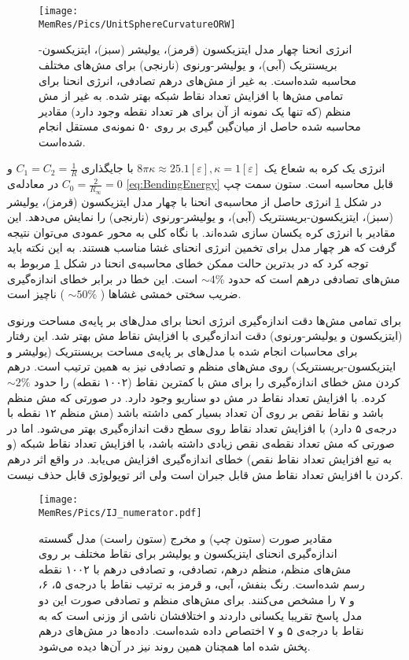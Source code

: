 \begin{figure}[htbp]
\begin{center}
\texttt{[image: \\MemRes/Pics/UnitSphereCurvatureORW]}
\caption{
انرژی انحنا چهار مدل ایتزیکسون (قرمز)، یولیشر (سبز)، ایتزیکسون-بریسنتریک (آبی)، و یولیشر-ورنوی (نارنجی) برای مش‌های مختلف محاسبه شده‌است. به غیر از مش‌های درهم تصادفی، انرژی انحنا برای تمامی مش‌ها با افزایش تعداد نقاط شبکه بهتر شده. به غیر از مش منظم (که تنها یک نمونه از آن برای هر تعداد نقطه وجود دارد) مقادیر محاسبه شده حاصل از میان‌گین گیری بر روی ۵۰ نمونه‌ی مستقل انجام شده‌است.
}
\label{fig:unitsphereBending}
\end{center}
\end{figure}

انرژی یک کره‌ به شعاع یک 
$8\pi\kappa\approx 25.1[\varepsilon],\kappa=1[\varepsilon]$
با جایگذاری 
$C_1=C_2=\frac{1}{R}$
و
$C_0=\frac{2}{R_\infty}=0$
در معادله‌ی 
\ref{eq:BendingEnergy}
قابل محاسبه‌ است. ستون سمت چپ در شکل 
\ref{fig:unitsphereBending}
انرژی حاصل از محاسبه‌ی انحنا با چهار مدل ایتزیکسون (قرمز)، یولیشر (سبز)، ایتزیکسون-بریسنتریک (آبی)، و یولیشر-ورنوی (نارنجی) را نمایش می‌دهد. این مقادیر با انرژی کره یکسان سازی شده‌اند. با نگاه کلی به محور عمودی می‌توان نتیجه گرفت که هر چهار مدل برای تخمین انرژی انحنای غشا مناسب هستند. به این نکته باید توجه کرد که در بدترین حالت ممکن خطای محاسبه‌ی انحنا در شکل 
\ref{fig:unitsphereBending}
مربوط به مش‌های تصادفی درهم است که حدود
$\sim4\%$
است. این خطا در برابر خطای اندازه‌گیری ضریب سختی خمشی غشا‌ها (
$\sim50\%$
) ناچیز است.

برای تمامی مش‌ها دقت اندازه‌گیری انرژی انحنا برای مدل‌های بر پایه‌ی مساحت ورنوی (ایتزیکسون و یولیشر-ورنوی) دقت اندازه‌گیری با افزایش نقاط مش بهتر شد. این رفتار برای محاسبات انجام شده با مدل‌های بر پایه‌ی مساحت بریسنتریک (یولیشر و ایتزیکسون-بریسنتریک) روی مش‌های منظم و تصادفی نیز به همین ترتیب است. درهم کردن مش خطای اندازه‌‌گیری را برای مش با کمترین نقاط (۱۰۰۲ نقطه) را حدود 
$\sim2\%$
کرده. با افزایش تعداد نقاط در مش دو سناریو وجود دارد. در صورتی که مش‌ منظم باشد و نقاط نقص بر روی آن تعداد بسیار کمی داشته باشد (مش منظم ۱۲ نقطه با درجه‌ی ۵ دارد) با افزایش تعداد نقاط روی سطح دقت اندازه‌گیری بهتر می‌شود. اما در صورتی که مش تعداد نقطه‌ی نقص زیادی داشته باشد، با افزایش تعداد نقاط شبکه (و به تبع افزایش تعداد نقاط نقص) خطای اندازه‌گیری افزایش می‌یابد. در واقع اثر درهم کردن با افزایش تعداد نقاط مش قابل جبران است ولی اثر توپولوژی قابل حذف نیست.



\begin{figure}[htbp]
\begin{center}
\texttt{[image: \\MemRes/Pics/IJ\_numerator.pdf]}
\caption{
مقادیر صورت (ستون چپ) و مخرج (ستون راست) مدل گسسته اندازه‌گیری انحنای ایتزیکسون و یولیشر برای نقاط مختلف بر روی مش‌های منظم، منظم درهم، تصادفی، و تصادفی درهم با ۱۰۰۲ نقطه رسم شده‌است. رنگ بنفش، آبی، و قرمز به ترتیب  نقاط با درجه‌ی ۵، ۶، و ۷ را مشخص می‌کنند. برای مش‌های منظم و تصادفی صورت این دو مدل پاسخ تقریبا یکسانی داردند و اختلافشان ناشی از وزنی است که به نقاط با درجه‌ی ۵ و ۷ اختصاص داده شده‌است. داده‌ها در مش‌های درهم پخش شده اما همچنان همین روند نیز در آن‌ها دیده می‌شود.
}
\label{fig:unitsphereBendingScatter}
\end{center}
\end{figure}

